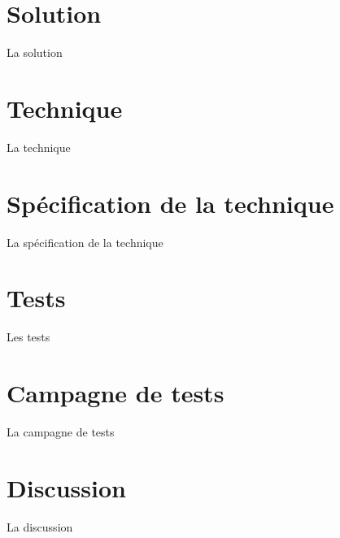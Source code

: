 \documentclass{article}
\begin{document}
\part*{Solution}
La solution
\part*{Technique}
La technique
\part*{Spécification de la technique}
La spécification de la technique
\part*{Tests}
Les tests
\part*{Campagne de tests}
La campagne de tests
\part*{Discussion}
La discussion
\end{document}
